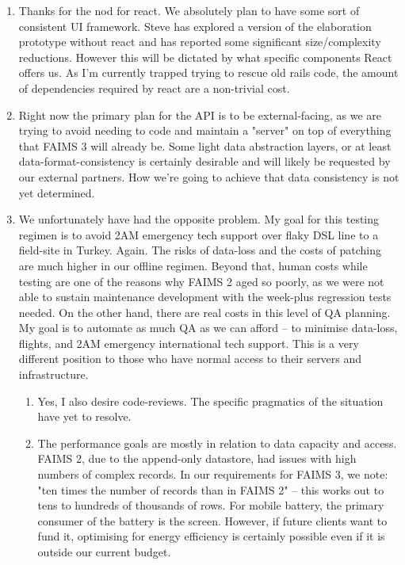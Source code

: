 \documentclass[a4paper,headings=small fontsize=10pt]{scrreprt}
\begin{document}
\begin{enumerate}
\def\labelenumi{\arabic{enumi}.}
\item Thanks for the nod for react. We absolutely plan to have some sort of
  consistent UI framework. Steve has explored a version of the
  elaboration prototype without react and has reported some significant
  size/complexity reductions. However this will be dictated by what
  specific components React offers us. As I'm currently trapped trying
  to rescue old rails code, the amount of dependencies required by react
  are a non-trivial cost.
 
\item Right now the primary plan for the API is to be external-facing, as we
  are trying to avoid needing to code and maintain a "server" on top of
  everything that FAIMS 3 will already be. Some light data abstraction
  layers, or at least data-format-consistency is certainly desirable and
  will likely be requested by our external partners. How we're going to
  achieve that data consistency is not yet determined.
 
\item We unfortunately have had the opposite problem. My goal for this
  testing regimen is to avoid 2AM emergency tech support over flaky DSL
  line to a field-site in Turkey. Again. The risks of data-loss and the
  costs of patching are much higher in our offline regimen. Beyond that,
  human costs while testing are one of the reasons why FAIMS 2 aged so
  poorly, as we were not able to sustain maintenance development with
  the week-plus regression tests needed. On the other hand, there are
  real costs in this level of QA planning. My goal is to automate as
  much QA as we can afford -- to minimise data-loss, flights, and 2AM
  emergency international tech support. This is a very different
  position to those who have normal access to their servers and
  infrastructure.
 

  \begin{enumerate}
  \def\labelenumii{\alph{enumii}.}
  \item     Yes, I also desire code-reviews. The specific pragmatics of the
    situation have yet to resolve.
   
  \item     The performance goals are mostly in relation to data capacity and
    access. FAIMS 2, due to the append-only datastore, had issues with
    high numbers of complex records. In our requirements for FAIMS 3, we
    note: "ten times the number of records than in FAIMS 2" -- this
    works out to tens to hundreds of thousands of rows. For mobile
    battery, the primary consumer of the battery is the screen. However,
    if future clients want to fund it, optimising for energy efficiency
    is certainly possible even if it is outside our current budget.
   

\end{enumerate}
\end{enumerate}
\end{document}
